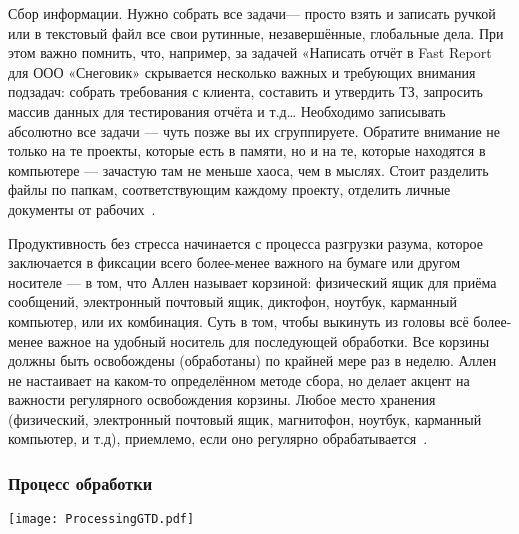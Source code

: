 \documentclass{../industrial-development}
\begin{document}
\lecturenotes

Сбор информации. Нужно собрать все задачи— просто взять и записать ручкой или в текстовый файл все свои рутинные, незавершённые, глобальные дела. При этом важно помнить, что, например, за задачей «Написать отчёт в Fast Report для ООО «Снеговик» скрывается несколько важных и требующих внимания подзадач: собрать требования с клиента, составить и утвердить ТЗ, запросить массив данных для тестирования отчёта и т.д… Необходимо записывать абсолютно все задачи — чуть позже вы их сгруппируете.
Обратите внимание не только на те проекты, которые есть в памяти, но и на те, которые находятся в компьютере — зачастую там не меньше хаоса, чем в мыслях. Стоит разделить файлы по папкам, соответствующим каждому проекту, отделить личные документы от рабочих~\cite{GTDHabr}. 

Продуктивность без стресса начинается с процесса разгрузки разума, которое заключается в фиксации всего более-менее важного на бумаге или другом носителе — в том, что Аллен называет корзиной: физический ящик для приёма сообщений, электронный почтовый ящик, диктофон, ноутбук, карманный компьютер, или их комбинация. Суть в том, чтобы выкинуть из головы всё более-менее важное на удобный носитель для последующей обработки. Все корзины должны быть освобождены (обработаны) по крайней мере раз в неделю. Аллен не настаивает на каком-то определённом методе сбора, но делает акцент на важности регулярного освобождения корзины. Любое место хранения (физический, электронный почтовый ящик, магнитофон, ноутбук, карманный компьютер, и т.д), приемлемо, если оно регулярно обрабатывается~\cite{GTDWikipedia}.

\begin{frame} \frametitle{Процесс обработки}
  \centerline{\texttt{[image: ProcessingGTD.pdf]}}
\end{frame}

\lecturenotes
\end{document}
